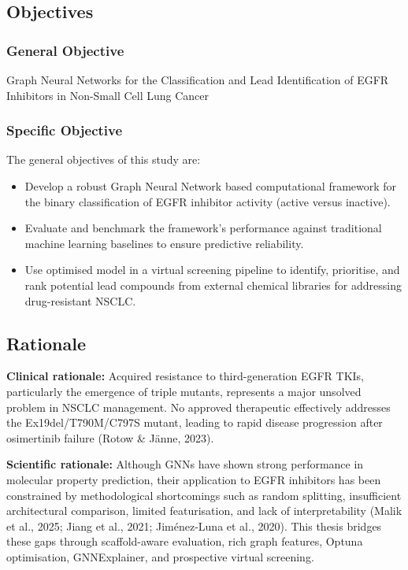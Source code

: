 \subsection{Objectives}

\subsubsection{General Objective}
Graph Neural Networks for the Classification and Lead Identification of EGFR Inhibitors in Non-Small Cell Lung Cancer

\subsubsection{Specific Objective}
The general objectives of this study are:
\begin{itemize}
    \item Develop a robust Graph Neural Network based computational framework for the binary classification of EGFR inhibitor activity (active versus inactive).
    \item Evaluate and benchmark the framework's performance against traditional machine learning baselines to ensure predictive reliability.
    \item Use optimised model in a virtual screening pipeline to identify, prioritise, and rank potential lead compounds from external chemical libraries for addressing drug-resistant NSCLC.
\end{itemize}

\subsection{Rationale}

\textbf{Clinical rationale:} Acquired resistance to third-generation EGFR TKIs, particularly the emergence of triple mutants, represents a major unsolved problem in NSCLC management. No approved therapeutic effectively addresses the Ex19del/T790M/C797S mutant, leading to rapid disease progression after osimertinib failure (Rotow \& Jänne, 2023).

\textbf{Scientific rationale:} Although GNNs have shown strong performance in molecular property prediction, their application to EGFR inhibitors has been constrained by methodological shortcomings such as random splitting, insufficient architectural comparison, limited featurisation, and lack of interpretability (Malik et al., 2025; Jiang et al., 2021; Jiménez-Luna et al., 2020). This thesis bridges these gaps through scaffold-aware evaluation, rich graph features, Optuna optimisation, GNNExplainer, and prospective virtual screening.

